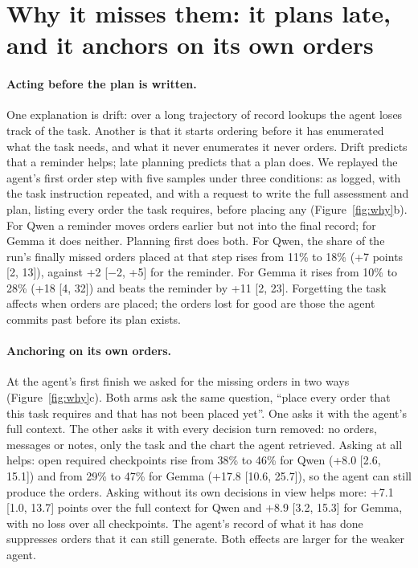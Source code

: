 \documentclass[11pt]{article}
\begin{document}
\section{Why it misses them: it plans late, and it anchors on its own orders}\label{sec:why}

\paragraph{Acting before the plan is written.} One explanation is drift: over a long trajectory of record lookups the
agent loses track of the task. Another is that it starts ordering before it has enumerated what the task needs, and
what it never enumerates it never orders. Drift predicts that a reminder helps; late planning predicts that a plan
does. We replayed the agent's first order step with five samples under three conditions: as logged, with the task
instruction repeated, and with a request to write the full assessment and plan, listing every order the task
requires, before placing any (Figure~\ref{fig:why}b). For Qwen a reminder moves orders earlier but not into the final
record; for Gemma it does neither. Planning first does both. For Qwen, the share of the run's finally missed orders
placed at that step rises from 11\% to 18\% (+7 points [2, 13]), against +2 [$-$2, +5] for the reminder. For Gemma it
rises from 10\% to 28\% (+18 [4, 32]) and beats the reminder by +11 [2, 23]. Forgetting the task affects when orders
are placed; the orders lost for good are those the agent commits past before its plan exists.

\paragraph{Anchoring on its own orders.} At the agent's first finish we asked for the missing orders in two ways
(Figure~\ref{fig:why}c). Both arms ask the same question, ``place every order that this task requires and that has
not been placed yet''. One asks it with the agent's full context. The other asks it with every decision turn removed:
no orders, messages or notes, only the task and the chart the agent retrieved. Asking at all helps: open required
checkpoints rise from 38\% to 46\% for Qwen (+8.0 [2.6, 15.1]) and from 29\% to 47\% for Gemma (+17.8 [10.6, 25.7]),
so the agent can still produce the orders. Asking without its own decisions in view helps more: +7.1 [1.0, 13.7]
points over the full context for Qwen and +8.9 [3.2, 15.3] for Gemma, with no loss over all checkpoints. The agent's
record of what it has done suppresses orders that it can still generate. Both effects are larger for the weaker
agent.
\end{document}
